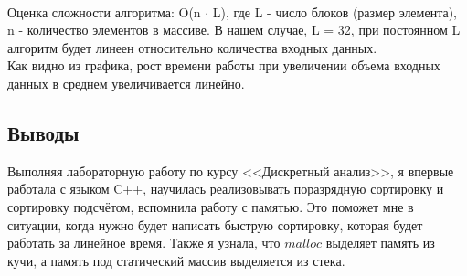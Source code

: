 \documentclass[12pt]{article}
\begin{document}
\vspace{1em}
\def\xmin{0}
\def\xmax{1.05e6}
\def\ymin{0}
\def\ymax{1000}
\\
Оценка сложности алгоритма: O(n $\cdot$ L), где L - число блоков (размер элемента), n - количество элементов в массиве. В нашем случае, L = 32, при постоянном L алгоритм будет линеен относительно количества входных данных.\\
Как видно из графика, рост времени работы при увеличении объема входных данных в среднем увеличивается линейно.

\subsection*{Выводы}

Выполняя лабораторную работу по курсу <<Дискретный анализ>>, я впервые работала с языком C++, научилась реализовывать поразрядную сортировку и сортировку подсчётом, вспомнила работу с памятью. Это поможет мне в ситуации, когда нужно будет написать быструю сортировку, которая будет работать за линейное время. Также я узнала, что $malloc$ выделяет память из кучи, а память под статический массив выделяется из стека.
\end{document}
